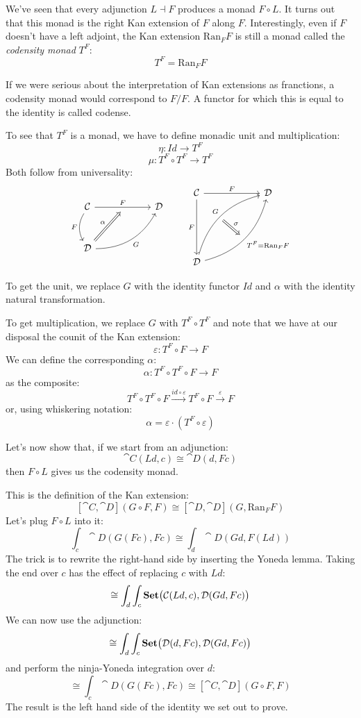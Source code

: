 \documentclass[DaoFP]{subfiles}
\begin{document}
 We've seen that every adjunction $L \dashv F$ produces a monad $F \circ L$. It turns out that this monad is the right Kan extension of $F$ along $F$. Interestingly, even if $F$ doesn't have a left adjoint, the Kan extension $\text{Ran}_F F$ is still a monad called the \emph{codensity monad} $T^F$:
 \[ T^F = \text{Ran}_F F \]
 
If we were serious about the interpretation of Kan extensions as franctions, a codensity monad would correspond to $F/F$. A functor for which this is equal to the identity is called codense.

To see that $T^F$ is a monad, we have to define monadic unit and multiplication:
\[ \eta \colon Id \to T^F \]
\[ \mu \colon T^F \circ T^F \to  T^F \]
 Both follow from universality:
\[
 \begin{tikzcd} [row sep=1cm, column sep=1cm]
 \cat C
 \arrow[rr, "F", "" {name=ID, below} ]
 \arrow[d, bend right, "F"']
 && \cat D
 \\
 \cat D
  \arrow[urr, bend right, "G"']
 \arrow[Rightarrow, "\alpha",  to=ID]
 \end{tikzcd}
 \qquad
\begin{tikzcd}[row sep=2cm, column sep=2cm]
\cat C  \ar[d, "F"', "" {name=P}]
            \ar[r, "F", ""  {name=F, below, near start, bend right}]
&
\cat D
\\
\cat D
    \ar[ur, bend left, "G", "" {name=G, below}]
    \ar[ur, bend right, "T^F = \text{Ran}_F F"', "" {name=Ran}]
\arrow[Rightarrow, "\sigma", from=G, to=Ran]
\end{tikzcd}
\]

To get the unit, we replace $G$ with the identity functor $Id$ and $\alpha$ with the identity natural transformation. 

To get multiplication, we replace $G$ with $T^F \circ T^F$ and note that we have at our disposal the counit of the Kan extension:
\[ \varepsilon \colon  T^F \circ F \to F \]
We can define the corresponding $\alpha$:
\[ \alpha \colon T^F \circ T^F \circ F \to F \]
as the composite:
\[ T^F \circ T^F \circ F \xrightarrow{id \circ \varepsilon} T^F \circ F \xrightarrow{\varepsilon} F\]
or, using whiskering notation:
\[ \alpha = \varepsilon \cdot (T^F \circ \varepsilon) \]


Let's now show that, if we start from an adjunction:
\[ \cat C(L d, c) \cong \cat D (d, F c) \]
then $F \circ L$ gives us the codensity monad.

This is the definition of the Kan extension:
\[ [\cat C, \cat D](G \circ F, F) \cong  [\cat D, \cat D] (G, \text{Ran}_F F)\]
Let's plug $F \circ L$ into it:
\[ \int_c \cat D( G (F c), F c) \cong \int_d \cat D (G d, F (L d)) \]
The trick is to rewrite the right-hand side by inserting the Yoneda lemma. Taking the end over $c$ has the effect of replacing $c$ with $L d$:
\[ \cong \int_d \int_c \mathbf{Set}\big(\mathcal{C}(L d, c), \mathcal{D} (G d, F c)\big) \]
We can now use the adjunction:
\[ \cong \int_d \int_c \mathbf{Set}\big(\mathcal{D}(d, F c), \mathcal{D} (G d, F c)\big) \]
and perform the ninja-Yoneda integration over $d$:
\[ \cong \int_c \cat D (G (F c), F c) \cong [\cat C, \cat D](G \circ F, F) \]
The result is the left hand side of the identity we set out to prove.
\end{document}

